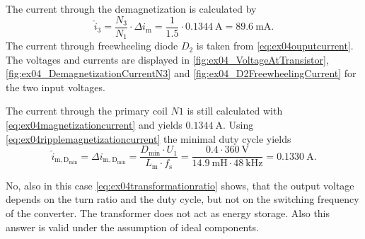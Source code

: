 \begin{solutionblock}
    The current through the demagnetization is calculated by
    \begin{equation}
        \hat{i}_\mathrm{3}=\frac{N_\mathrm{3}}{N_\mathrm{1}} \cdot \Delta i_\mathrm{m}
        =\frac{1}{1.5} \cdot \SI{0.1344}{\ampere}=\SI{89.6}{\milli\ampere}.
    \end{equation}
    The current through freewheeling diode $D_\mathrm{2}$ is taken from \eqref{eq:ex04ouputcurrent}.
    The voltages and currents are displayed in \autoref{fig:ex04_VoltageAtTransistor}, 
    \autoref{fig:ex04_DemagnetizationCurrentN3} and \autoref{fig:ex04_D2FreewheelingCurrent} for the two input voltages.
      
\end{solutionblock}
        
\begin{solutionblock}
    The current through the primary coil $N1$ is still calculated with \eqref{eq:ex04magnetizationcurrent} and yields
    $\SI{0.1344}{\ampere}$. 
    Using \eqref{eq:ex04ripplemagnetizationcurrent} the minimal duty cycle yields
    \begin{equation}
        \hat{i}_\mathrm{m,D_{min}}=\Delta i_\mathrm{m,D_{min}}= \frac{D_\mathrm{min} \cdot U_\mathrm{1}}{L_\mathrm{m} \cdot f_\mathrm{s}}
        =\frac{0.4 \cdot \SI{360}{\volt}}{\SI{14.9}{\milli\henry} \cdot \SI{48}{\kilo\hertz}}=\SI{0.1330}{\ampere}.
    \end{equation}
\end{solutionblock}


\begin{solutionblock}
    No,  also in this case \eqref{eq:ex04transformationratio} shows, that the output voltage depends on the turn ratio and the duty cycle,
    but not on the switching frequency of the converter. The transformer does not act as energy storage.
    Also this answer is valid under the assumption of ideal components. 
\end{solutionblock}